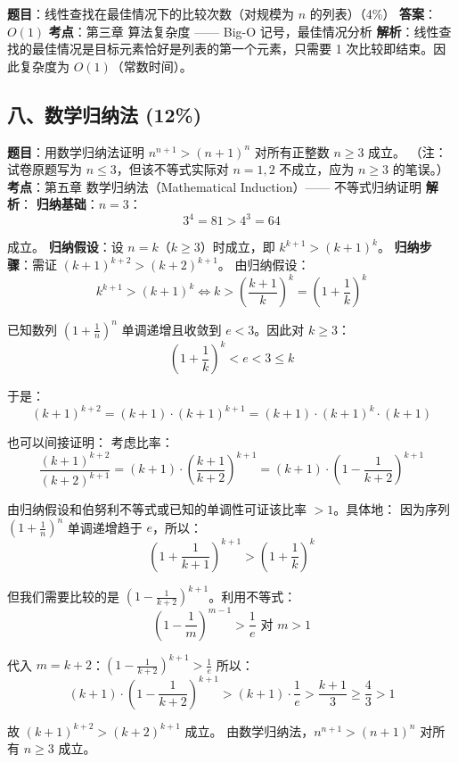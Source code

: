 \documentclass[10pt,a4paper,openany]{ctexbook}
\theoremstyle{definition}
\theoremstyle{remark}
\begin{document}
\textbf{题目}：线性查找在最佳情况下的比较次数（对规模为 $n$ 的列表）（4\%）
\textbf{答案}：$O(1)$
\textbf{考点}：第三章 算法复杂度 —— Big-O 记号，最佳情况分析
\textbf{解析}：线性查找的最佳情况是目标元素恰好是列表的第一个元素，只需要 1 次比较即结束。因此复杂度为 $O(1)$（常数时间）。
\vspace{-2pt}

\subsection{八、数学归纳法 (12\%)}

\textbf{题目}：用数学归纳法证明 $n^{n+1} > (n+1)^n$ 对所有正整数 $n \ge 3$ 成立。
（注：试卷原题写为 $n \le 3$，但该不等式实际对 $n = 1, 2$ 不成立，应为 $n \ge 3$ 的笔误。）
\textbf{考点}：第五章 数学归纳法（Mathematical Induction）—— 不等式归纳证明
\textbf{解析}：
\textbf{归纳基础}：$n = 3$：
\[
3^{4} = 81 > 4^{3} = 64
\]

成立。
\textbf{归纳假设}：设 $n = k$（$k \ge 3$）时成立，即 $k^{k+1} > (k+1)^k$。
\textbf{归纳步骤}：需证 $(k+1)^{k+2} > (k+2)^{k+1}$。
由归纳假设：
\[
k^{k+1} > (k+1)^k \iff k > \left(\frac{k+1}{k}\right)^k = \left(1 + \frac{1}{k}\right)^k
\]

已知数列 $\left(1 + \frac{1}{n}\right)^n$ 单调递增且收敛到 $e < 3$。因此对 $k \ge 3$：
\[
\left(1 + \frac{1}{k}\right)^k < e < 3 \le k
\]

于是：
\[
(k+1)^{k+2} = (k+1) \cdot (k+1)^{k+1} 
= (k+1) \cdot (k+1)^k \cdot (k+1)
\]

也可以间接证明：
考虑比率：
\[
\frac{(k+1)^{k+2}}{(k+2)^{k+1}} = (k+1) \cdot \left(\frac{k+1}{k+2}\right)^{k+1} = (k+1) \cdot \left(1 - \frac{1}{k+2}\right)^{k+1}
\]

由归纳假设和伯努利不等式或已知的单调性可证该比率 $> 1$。具体地：
因为序列 $\left(1 + \frac{1}{n}\right)^n$ 单调递增趋于 $e$，所以：
\[
\left(1 + \frac{1}{k+1}\right)^{k+1} > \left(1 + \frac{1}{k}\right)^k
\]

但我们需要比较的是 $(1 - \frac{1}{k+2})^{k+1}$。利用不等式：
\[
\left(1 - \frac{1}{m}\right)^{m-1} > \frac{1}{e} \text{ 对 } m > 1
\]

代入 $m = k+2$：$\left(1 - \frac{1}{k+2}\right)^{k+1} > \frac{1}{e}$
所以：
\[
(k+1) \cdot \left(1 - \frac{1}{k+2}\right)^{k+1} > (k+1) \cdot \frac{1}{e} > \frac{k+1}{3} \ge \frac{4}{3} > 1
\]

故 $(k+1)^{k+2} > (k+2)^{k+1}$ 成立。
由数学归纳法，$n^{n+1} > (n+1)^n$ 对所有 $n \ge 3$ 成立。

\newpage
\end{document}
